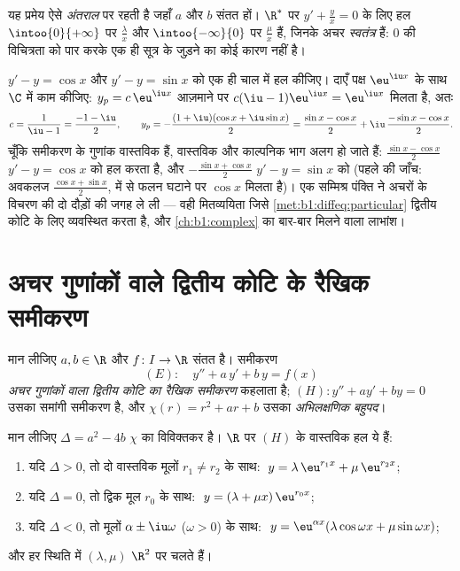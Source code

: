 \begin{remark}
यह प्रमेय ऐसे \emph{अंतराल} पर रहती है जहाँ $a$ और $b$ संतत हों। $\R^*$ पर
$y' + \frac yx = 0$ के लिए हल $\intoo{0}{+\infty}$ पर $\frac{\lambda}{x}$ और
$\intoo{-\infty}{0}$ पर $\frac{\mu}{x}$ हैं, जिनके अचर \emph{स्वतंत्र} हैं:
$0$ की विचित्रता को पार करके एक ही सूत्र के जुड़ने का कोई कारण नहीं है।
\end{remark}

\begin{example}[सम्मिश्र दायाँ पक्ष, दो वास्तविक उत्तर]\label{ex:b1:diffeq:complexrhs}
$y' - y = \cos x$ और $y' - y = \sin x$ को एक ही चाल में हल कीजिए। दाएँ पक्ष
$\eu^{\iu x}$ के साथ $\C$ में काम कीजिए: $y_p = c\,\eu^{\iu x}$ आज़माने पर
$c(\iu - 1)\eu^{\iu x} = \eu^{\iu x}$ मिलता है, अतः
\[
c = \frac1{\iu - 1} = \frac{-1 - \iu}2,
\qquad
y_p = -\frac{(1 + \iu)(\cos x + \iu\sin x)}2
= \frac{\sin x - \cos x}2 + \iu\,\frac{-\sin x - \cos x}2 .
\]
चूँकि समीकरण के गुणांक वास्तविक हैं, वास्तविक और काल्पनिक भाग अलग हो जाते
हैं: $\frac{\sin x - \cos x}2$ $y' - y = \cos x$ को हल करता है, और
$-\frac{\sin x + \cos x}2$ $y' - y = \sin x$ को (पहले की जाँच: अवकलज
$\frac{\cos x + \sin x}2$, में से फलन घटाने पर $\cos x$ मिलता है)। एक
सम्मिश्र पंक्ति ने अचरों के विचरण की दो दौड़ों की जगह ले ली --- वही
मितव्ययिता जिसे \cref{met:b1:diffeq:particular} द्वितीय कोटि के लिए
व्यवस्थित करता है, और \cref{ch:b1:complex} का बार-बार मिलने वाला लाभांश।
\end{example}

\section{अचर गुणांकों वाले द्वितीय कोटि के रैखिक समीकरण}

\begin{definition}\label{def:b1:diffeq:linear2}
मान लीजिए $a, b \in \R$ और $f \colon I \to \R$ संतत है। समीकरण
\[
(E)\colon\quad y'' + a\,y' + b\,y = f(x)
\]
\emph{अचर गुणांकों वाला द्वितीय कोटि का रैखिक समीकरण} कहलाता है; $(H)\colon y'' + ay' + by = 0$ उसका
समांगी समीकरण है, और $\chi(r) = r^2 + ar + b$ उसका \emph{अभिलक्षणिक
बहुपद}।
\end{definition}

\begin{theorem}[समांगी हल]\label{thm:b1:diffeq:homogeneous2}
मान लीजिए $\Delta = a^2 - 4b$ $\chi$ का विविक्तकर है। $\R$ पर $(H)$ के
वास्तविक हल ये हैं:
\begin{enumerate}
  \item यदि $\Delta > 0$, तो दो वास्तविक मूलों $r_1 \neq r_2$ के साथ: $\;y =
  \lambda\, \eu^{r_1 x} + \mu\, \eu^{r_2 x}$;
  \item यदि $\Delta = 0$, तो द्विक मूल $r_0$ के साथ: $\;y = (\lambda + \mu
  x)\, \eu^{r_0 x}$;
  \item यदि $\Delta < 0$, तो मूलों $\alpha \pm \iu\omega$ ($\omega > 0$) के
  साथ: $\;y = \eu^{\alpha x} (\lambda \cos\omega x + \mu \sin\omega x)$;
\end{enumerate}
और हर स्थिति में $(\lambda, \mu)$ $\R^2$ पर चलते हैं।
\end{theorem}

